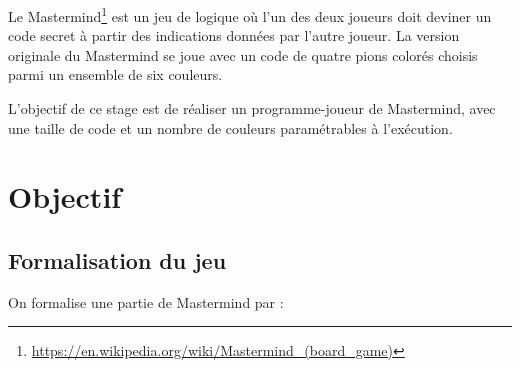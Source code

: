 \documentclass[a4paper]{article}
\renewcommand{\(}{\begin{math}\color{brick}}
\renewcommand{\)}{\end{math}}
\begin{document}
Le Mastermind\footnote{\url{https://en.wikipedia.org/wiki/Mastermind_(board_game)}} est un jeu de logique où l'un des deux joueurs doit deviner un code secret à partir des indications données par l'autre joueur. La version originale du Mastermind se joue avec un code de quatre pions colorés choisis parmi un ensemble de six couleurs.

L'objectif de ce stage est de réaliser un programme-joueur de Mastermind, avec une taille de code et un nombre de couleurs paramétrables à l'exécution.

\section{Objectif}

\subsection{Formalisation du jeu}

On formalise une partie de Mastermind par :
\end{document}
